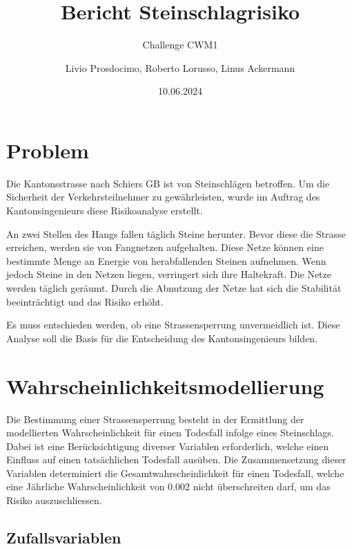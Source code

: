 \documentclass[
  letterpaper,
  DIV=11,
  numbers=noendperiod]{scrartcl}
\title{Bericht Steinschlagrisiko}
\subtitle{Challenge CWM1}
\author{Livio Prosdocimo, Roberto Lorusso, Linus Ackermann}
\date{10.06.2024}
\renewcommand*\contentsname{Table of contents}
\newcommand\contentsname{Table of contents}
\begin{document}
\maketitle

\renewcommand*\contentsname{Inhaltsverzeichnis}
{
\hypersetup{linkcolor=}
\setcounter{tocdepth}{3}
\tableofcontents
}
\newpage

\section{Problem}\label{problem}

Die Kantonsstrasse nach Schiers GB ist von Steinschlägen betroffen. Um
die Sicherheit der Verkehrsteilnehmer zu gewährleisten, wurde im Auftrag
des Kantonsingenieurs diese Risikoanalyse erstellt.

An zwei Stellen des Hangs fallen täglich Steine herunter. Bevor diese
die Strasse erreichen, werden sie von Fangnetzen aufgehalten. Diese
Netze können eine bestimmte Menge an Energie von herabfallenden Steinen
aufnehmen. Wenn jedoch Steine in den Netzen liegen, verringert sich ihre
Haltekraft. Die Netze werden täglich geräumt. Durch die Abnutzung der
Netze hat sich die Stabilität beeinträchtigt und das Risiko erhöht.

Es muss entschieden werden, ob eine Strassensperrung unvermeidlich ist.
Diese Analyse soll die Basis für die Entscheidung des Kantonsingenieurs
bilden.

\section{Wahrscheinlichkeitsmodellierung}\label{wahrscheinlichkeitsmodellierung}

Die Bestimmung einer Strassensperrung besteht in der Ermittlung der
modellierten Wahrscheinlichkeit für einen Todesfall infolge eines
Steinschlags. Dabei ist eine Berücksichtigung diverser Variablen
erforderlich, welche einen Einfluss auf einen tatsächlichen Todesfall
ausüben. Die Zusammensetzung dieser Variablen determiniert die
Gesamtwahrscheinlichkeit für einen Todesfall, welche eine Jährliche
Wahrscheinlichkeit von 0.002 nicht überschreiten darf, um das Risiko
auszuschliessen.

\newpage

\subsection{Zufallsvariablen}\label{zufallsvariablen}
\end{document}

